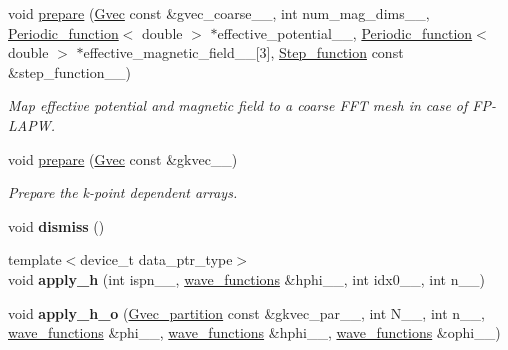 \begin{DoxyCompactItemize}
void \hyperlink{classsirius_1_1_local__operator_a9a8908fedff45ac1346a45b6d7d5e4fe}{prepare} (\hyperlink{classsddk_1_1_gvec}{Gvec} const \&gvec\+\_\+coarse\+\_\+\+\_\+, int num\+\_\+mag\+\_\+dims\+\_\+\+\_\+, \hyperlink{classsirius_1_1_periodic__function}{Periodic\+\_\+function}$<$ double $>$ $\ast$effective\+\_\+potential\+\_\+\+\_\+, \hyperlink{classsirius_1_1_periodic__function}{Periodic\+\_\+function}$<$ double $>$ $\ast$effective\+\_\+magnetic\+\_\+field\+\_\+\+\_\+\mbox{[}3\mbox{]}, \hyperlink{classsirius_1_1_step__function}{Step\+\_\+function} const \&step\+\_\+function\+\_\+\+\_\+)
\begin{DoxyCompactList}\small\item\em Map effective potential and magnetic field to a coarse F\+F\+T mesh in case of F\+P-\/\+L\+A\+P\+W. \end{DoxyCompactList}\item 
void \hyperlink{classsirius_1_1_local__operator_a3ff0b81662d6b00347a9cbe0a491412a}{prepare} (\hyperlink{classsddk_1_1_gvec}{Gvec} const \&gkvec\+\_\+\+\_\+)
\begin{DoxyCompactList}\small\item\em Prepare the k-\/point dependent arrays. \end{DoxyCompactList}\item 
\hypertarget{classsirius_1_1_local__operator_adeed051901f299991309fd2341aea1d9}{}void {\bfseries dismiss} ()\label{classsirius_1_1_local__operator_adeed051901f299991309fd2341aea1d9}

\item 
\hypertarget{classsirius_1_1_local__operator_a7ac0e07c47771d0afb09a5e7cbefdd15}{}{\footnotesize template$<$device\+\_\+t data\+\_\+ptr\+\_\+type$>$ }\\void {\bfseries apply\+\_\+h} (int ispn\+\_\+\+\_\+, \hyperlink{classsddk_1_1wave__functions}{wave\+\_\+functions} \&hphi\+\_\+\+\_\+, int idx0\+\_\+\+\_\+, int n\+\_\+\+\_\+)\label{classsirius_1_1_local__operator_a7ac0e07c47771d0afb09a5e7cbefdd15}

\item 
\hypertarget{classsirius_1_1_local__operator_a99a0802b46bba3ff0121de2bc360fc13}{}void {\bfseries apply\+\_\+h\+\_\+o} (\hyperlink{classsddk_1_1_gvec__partition}{Gvec\+\_\+partition} const \&gkvec\+\_\+par\+\_\+\+\_\+, int N\+\_\+\+\_\+, int n\+\_\+\+\_\+, \hyperlink{classsddk_1_1wave__functions}{wave\+\_\+functions} \&phi\+\_\+\+\_\+, \hyperlink{classsddk_1_1wave__functions}{wave\+\_\+functions} \&hphi\+\_\+\+\_\+, \hyperlink{classsddk_1_1wave__functions}{wave\+\_\+functions} \&ophi\+\_\+\+\_\+)\label{classsirius_1_1_local__operator_a99a0802b46bba3ff0121de2bc360fc13}


\end{DoxyCompactItemize}
